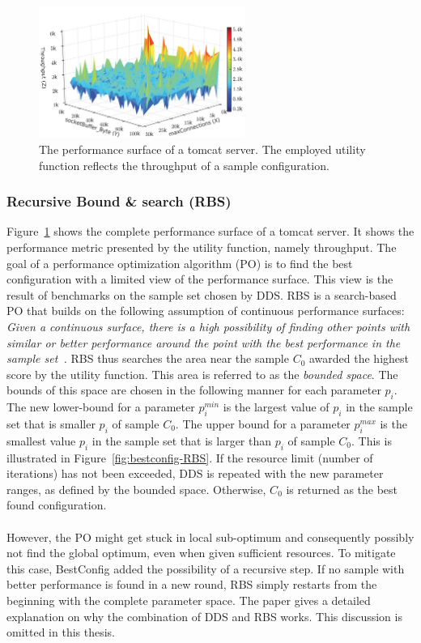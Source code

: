 \begin{figure}
    \centering
    \includegraphics[width=0.6\textwidth]{chapter-related-work/images-bestconfig/bestconfig-surface.png}
    \caption{The performance surface of a tomcat server. The employed utility function reflects the throughput of a sample configuration.~\cite{zhu2017bestconfig} }
    \label{fig:bestconfig-surface}
\end{figure}


\subsubsection{Recursive Bound \& search (RBS)}
Figure~\ref{fig:bestconfig-surface} shows the complete performance surface of a tomcat server. It shows the performance metric presented by the utility function, namely throughput. The goal of a performance optimization algorithm (PO) is to find the best configuration with a limited view of the performance surface. This view is the result of benchmarks on the sample set chosen by DDS. RBS is a search-based PO that builds on the following assumption of continuous  performance surfaces: \textit{Given a continuous surface, there is a high possibility of finding other points with similar or better performance around the point with the best performance in the sample set~\cite{zhu2017bestconfig}.} RBS thus searches the area near the sample $C_{0}$ awarded the highest score by the utility function. This area is referred to as the \textit{bounded space}. The bounds of this space are chosen in the following manner for each parameter $p_{i}$. The new lower-bound for a parameter $p_{i}^{min}$ is the largest value of $p_{i}$ in the sample set that is smaller $p_{i}$ of sample $C_{0}$. The upper bound for a parameter $p_{i}^{max}$ is the smallest value $p_{i}$ in the sample set that is larger than $p_{i}$  of sample $C_{0}$. This is illustrated in Figure~\ref{fig:bestconfig-RBS}. If the resource limit (number of iterations) has not been exceeded, DDS is repeated with the new parameter ranges, as defined by the bounded space. Otherwise, $C_{0}$ is returned as the best found configuration.~\cite{zhu2017bestconfig}\\\\
However, the PO might get stuck in local sub-optimum and consequently possibly not find the global optimum, even when given sufficient resources. To mitigate this case, BestConfig added the possibility of a recursive step. If no sample with better performance is found in a new round, RBS simply restarts from the beginning with the complete parameter space. The paper gives a detailed explanation on why the combination of DDS and RBS works. This discussion is omitted in this thesis.~\cite{zhu2017bestconfig}
